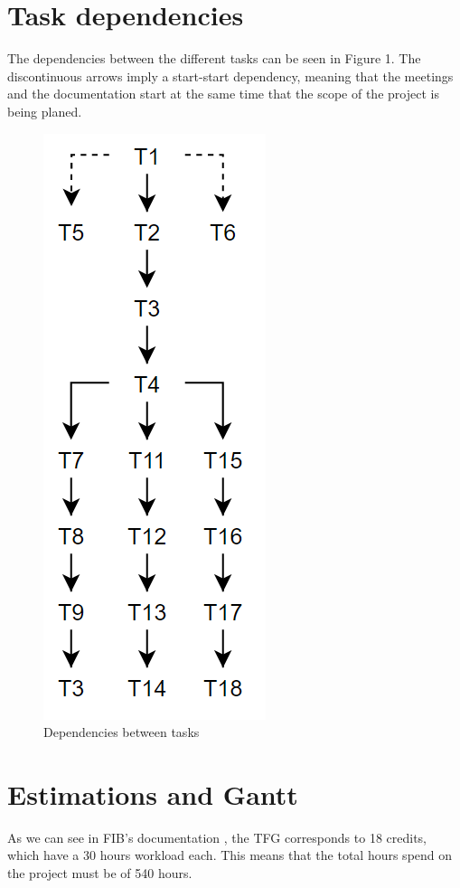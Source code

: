 \documentclass{article}
\begin{document}
\section{Task dependencies}
The dependencies between the different tasks can be seen in Figure 1. The discontinuous arrows imply a start-start dependency, meaning that the meetings and the documentation start at the same time that the scope of the project is being planed.
\begin{figure}[h]
    \centering
    \includegraphics[scale=0.5]{./dependencies.PNG}
    \caption{Dependencies between tasks}
\end{figure}

\vfill

\break

\section{Estimations and Gantt}
As we can see in FIB's documentation \cite{hores}, the TFG corresponds to 18 credits, which have a 30 hours workload each. This means that the total hours spend on the project must be of 540 hours.
\end{document}
